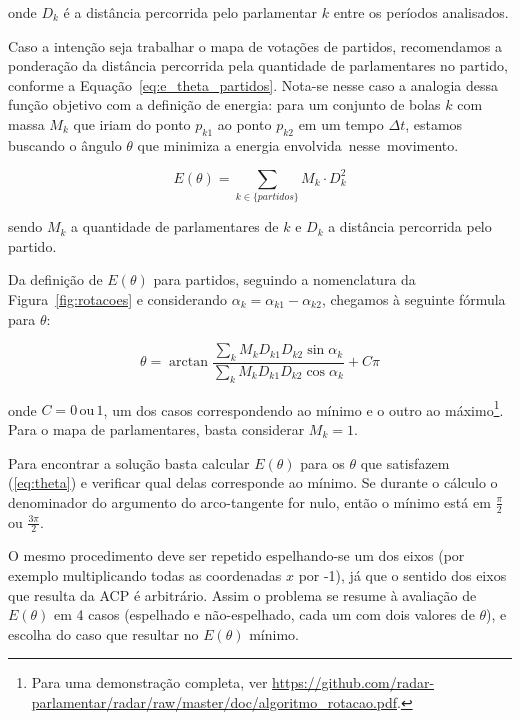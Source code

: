 \documentclass[
	article,			%
	12pt,				%
    twoside,			%
	a4paper,			%
	english,			%
	french,				%
	spanish,			%
	brazil,				%
	]{abntex2}
\begin{document}
onde $D_{k}$ é a distância percorrida pelo parlamentar $k$ entre os períodos analisados.

Caso a intenção seja trabalhar o mapa de votações de partidos, recomendamos a ponderação da distância percorrida pela quantidade de parlamentares no partido, conforme a Equação~\ref{eq:e_theta_partidos}. Nota-se nesse caso a analogia dessa função objetivo com a definição de energia: para um conjunto de bolas $k$ com massa $M_{k}$ que iriam do ponto $p_{k1}$ ao ponto $p_{k2}$ em um tempo $\Delta t$, estamos buscando o ângulo $\theta$ que minimiza a energia envolvida~nesse~movimento. 

\begin{equation}
E(\theta)=\sum_{k\in\{partidos\}}M_{k}\cdot D_{k}^{2}
\label{eq:e_theta_partidos}
\end{equation}

sendo $M_{k}$ a quantidade de parlamentares de $k$ e $D_{k}$ a distância percorrida pelo partido.


Da definição de $E(\theta)$ para partidos, seguindo a nomenclatura da Figura~\ref{fig:rotacoes} e considerando $\alpha_k = \alpha_{k1} - \alpha_{k2}$, chegamos à seguinte fórmula para $\theta$:

\begin{equation}
\theta=\arctan\frac{\sum_{k}M_{k}D_{k1}D_{k2}\sin\alpha_{k}}{\sum_{k}M_{k}D_{k1}D_{k2}\cos\alpha_{k}}+C\pi
\label{eq:theta}
\end{equation}

onde $C=0\mathrm{\, ou}\,1$, um dos casos correspondendo ao mínimo e o outro ao máximo\footnote{Para uma demonstração completa, ver \url{https://github.com/radar-parlamentar/radar/raw/master/doc/algoritmo_rotacao.pdf}.}. Para o mapa de parlamentares, basta considerar $M_{k} = 1$.

Para encontrar a solução basta calcular $E(\theta)$ para os $\theta$ que satisfazem (\ref{eq:theta}) e verificar qual delas corresponde ao mínimo. Se durante o cálculo o denominador do argumento do arco-tangente for nulo, então o mínimo está em $\frac{\pi}{2}$ ou $\frac{3\pi}{2}$.

O mesmo procedimento deve ser repetido espelhando-se um dos eixos (por exemplo multiplicando todas as coordenadas $x$ por -1), já que o sentido dos eixos que resulta da ACP é arbitrário. Assim o problema se resume à avaliação de $E(\theta)$ em 4 casos (espelhado e não-espelhado, cada um com dois valores de $\theta$), e escolha do caso que resultar no $E(\theta)$ mínimo.
\end{document}
